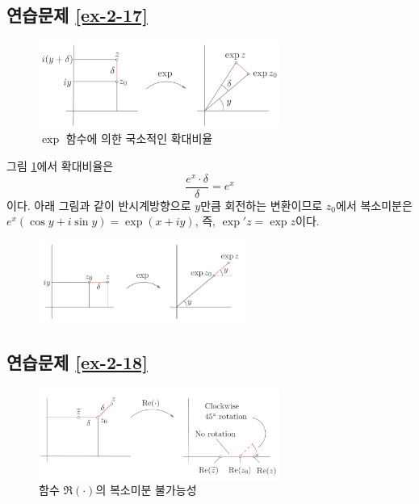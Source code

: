 \subsection*{연습문제 \ref{ex-2-17}}

\begin{figure}[h!]
\begin{center}
\includegraphics[width=0.7\textwidth]{./Solution/figs/fig-5-15}
\end{center}
\caption{$\exp$ 함수에 의한 국소적인 확대비율
}
\label{fig-5-15}
\end{figure}

그림 \ref{fig-5-15}에서
확대비율은
\[
\dfrac{e^x\cdot \delta}{\delta} = e^x
\]
이다. 
아래 그림과 같이 반시계방향으로  $y$만큼 회전하는 변환이므로
$z_0$에서 복소미분은 $e^x(\cos y + i\sin y) = \exp(x+iy)$,
즉, $\exp' z = \exp z$이다.

\begin{figure}[h!]
\begin{center}
\includegraphics[width=0.6\textwidth]{./Solution/figs/fig-s-0-7}
\end{center}
\end{figure}

\subsection*{연습문제 \ref{ex-2-18}}
\begin{figure}[h!]
\begin{center}
\includegraphics[width=0.7\textwidth]{./Solution/figs/fig-5-16}
\end{center}
\caption{함수 $\Re(\cdot)$의 복소미분 불가능성}
\label{fig-5-16}
\end{figure}

